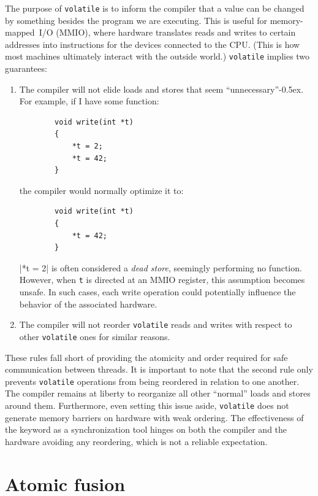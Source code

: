 \documentclass[fontsize=10pt, oneside]{scrartcl}
\newcommand{\codesize}{\fontsize{\bodyfontsize}{\bodybaselineskip}}
\newcommand{\quotekern}{\kern-0.5ex}
\newcommand{\monobox}[1]{\mbox{\texttt{#1}}}
\newcommand{\keyword}[1]{\monobox{\color{darkGreen}#1}}
\newcommand{\introduce}[1]{\textit{#1}}
\begin{document}
The purpose of \keyword{volatile} is to inform the compiler that a value can be changed by something besides the program we are executing.
This is useful for memory-mapped~\textsc{I/O} (\textsc{MMIO}),
where hardware translates reads and writes to certain addresses into instructions for the devices connected to the \textsc{CPU}.
(This is how most machines ultimately interact with the outside world.)
\keyword{volatile} implies two guarantees:
\begin{enumerate}
  \item The compiler will not elide loads and stores that seem ``unnecessary''\quotekern.
        For example, if I have some function:
        \begin{verbatim}
        void write(int *t)
        {
            *t = 2;
            *t = 42;
        }
        \end{verbatim}
        the compiler would normally optimize it to:
        \begin{verbatim}
        void write(int *t)
        {
            *t = 42;
        }
        \end{verbatim}
        \cpp|*t = 2| is often considered a \introduce{dead store},
        seemingly performing no function.
        However, when \texttt{t} is directed at an \textsc{MMIO} register,
        this assumption becomes unsafe.
        In such cases, each write operation could potentially influence the behavior of the associated hardware.

  \item The compiler will not reorder \keyword{volatile} reads and writes with respect to other \keyword{volatile} ones for similar reasons.
\end{enumerate}

These rules fall short of providing the atomicity and order required for safe communication between threads.
It is important to note that the second rule only prevents \keyword{volatile} operations from being reordered in relation to one another.
The compiler remains at liberty to reorganize all other ``normal'' loads and stores around them.
Furthermore, even setting this issue aside,
\keyword{volatile} does not generate memory barriers on hardware with weak ordering.
The effectiveness of the keyword as a synchronization tool hinges on both the compiler and the hardware avoiding any reordering,
which is not a reliable expectation.
\section{Atomic fusion}
\label{fusing}
\end{document}

